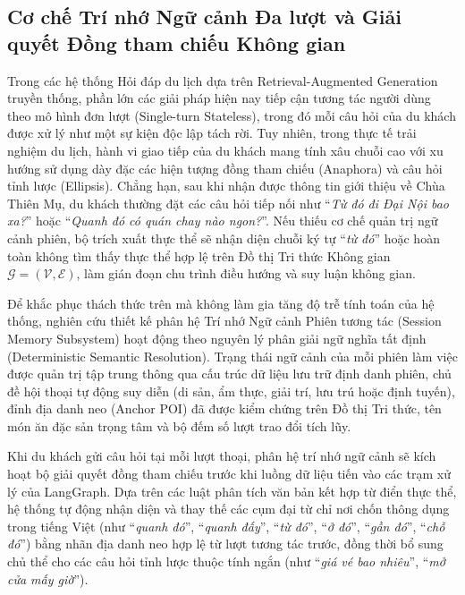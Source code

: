 \subsection{Cơ chế Trí nhớ Ngữ cảnh Đa lượt và Giải quyết Đồng tham chiếu Không gian}
\label{subsec:ch1-session-memory}

Trong các hệ thống Hỏi đáp du lịch dựa trên Retrieval-Augmented Generation truyền thống, phần lớn các giải pháp hiện nay tiếp cận tương tác người dùng theo mô hình đơn lượt (Single-turn Stateless), trong đó mỗi câu hỏi của du khách được xử lý như một sự kiện độc lập tách rời. Tuy nhiên, trong thực tế trải nghiệm du lịch, hành vi giao tiếp của du khách mang tính xâu chuỗi cao với xu hướng sử dụng dày đặc các hiện tượng đồng tham chiếu (Anaphora) và câu hỏi tỉnh lược (Ellipsis). Chẳng hạn, sau khi nhận được thông tin giới thiệu về Chùa Thiên Mụ, du khách thường đặt các câu hỏi tiếp nối như ``\textit{Từ đó đi Đại Nội bao xa?}'' hoặc ``\textit{Quanh đó có quán chay nào ngon?}''. Nếu thiếu cơ chế quản trị ngữ cảnh phiên, bộ trích xuất thực thể sẽ nhận diện chuỗi ký tự ``\textit{từ đó}'' hoặc hoàn toàn không tìm thấy thực thể hợp lệ trên Đồ thị Tri thức Không gian $\mathcal{G} = (\mathcal{V}, \mathcal{E})$, làm gián đoạn chu trình điều hướng và suy luận không gian.

Để khắc phục thách thức trên mà không làm gia tăng độ trễ tính toán của hệ thống, nghiên cứu thiết kế phân hệ Trí nhớ Ngữ cảnh Phiên tương tác (Session Memory Subsystem) hoạt động theo nguyên lý phân giải ngữ nghĩa tất định (Deterministic Semantic Resolution). Trạng thái ngữ cảnh của mỗi phiên làm việc được quản trị tập trung thông qua cấu trúc dữ liệu lưu trữ định danh phiên, chủ đề hội thoại tự động suy diễn (di sản, ẩm thực, giải trí, lưu trú hoặc định tuyến), đỉnh địa danh neo (Anchor POI) đã được kiểm chứng trên Đồ thị Tri thức, tên món ăn đặc sản trọng tâm và bộ đếm số lượt trao đổi tích lũy.

Khi du khách gửi câu hỏi tại mỗi lượt thoại, phân hệ trí nhớ ngữ cảnh sẽ kích hoạt bộ giải quyết đồng tham chiếu trước khi luồng dữ liệu tiến vào các trạm xử lý của LangGraph. Dựa trên các luật phân tích văn bản kết hợp từ điển thực thể, hệ thống tự động nhận diện và thay thế các cụm đại từ chỉ nơi chốn thông dụng trong tiếng Việt (như ``\textit{quanh đó}'', ``\textit{quanh đấy}'', ``\textit{từ đó}'', ``\textit{ở đó}'', ``\textit{gần đó}'', ``\textit{chỗ đó}'') bằng nhãn địa danh neo hợp lệ từ lượt tương tác trước, đồng thời bổ sung chủ thể cho các câu hỏi tỉnh lược thuộc tính ngắn (như ``\textit{giá vé bao nhiêu}'', ``\textit{mở cửa mấy giờ}'').

